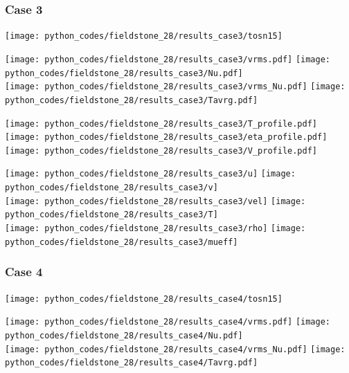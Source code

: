 \newpage %
\subsubsection*{Case 3}

\texttt{[image: python\_codes/fieldstone\_28/results\_case3/tosn15]}

\begin{center}
\texttt{[image: python\_codes/fieldstone\_28/results\_case3/vrms.pdf]}
\texttt{[image: python\_codes/fieldstone\_28/results\_case3/Nu.pdf]}\\
\texttt{[image: python\_codes/fieldstone\_28/results\_case3/vrms\_Nu.pdf]}
\texttt{[image: python\_codes/fieldstone\_28/results\_case3/Tavrg.pdf]}
\end{center}

\begin{center}
\texttt{[image: python\_codes/fieldstone\_28/results\_case3/T\_profile.pdf]}
\texttt{[image: python\_codes/fieldstone\_28/results\_case3/eta\_profile.pdf]}
\texttt{[image: python\_codes/fieldstone\_28/results\_case3/V\_profile.pdf]}
\end{center}

\newpage
\begin{center}
\texttt{[image: python\_codes/fieldstone\_28/results\_case3/u]}
\texttt{[image: python\_codes/fieldstone\_28/results\_case3/v]}\\
\texttt{[image: python\_codes/fieldstone\_28/results\_case3/vel]}
\texttt{[image: python\_codes/fieldstone\_28/results\_case3/T]}\\
\texttt{[image: python\_codes/fieldstone\_28/results\_case3/rho]}
\texttt{[image: python\_codes/fieldstone\_28/results\_case3/mueff]}
\end{center}




\newpage %
\subsubsection*{Case 4}

\texttt{[image: python\_codes/fieldstone\_28/results\_case4/tosn15]}

\begin{center}
\texttt{[image: python\_codes/fieldstone\_28/results\_case4/vrms.pdf]}
\texttt{[image: python\_codes/fieldstone\_28/results\_case4/Nu.pdf]}\\
\texttt{[image: python\_codes/fieldstone\_28/results\_case4/vrms\_Nu.pdf]}
\texttt{[image: python\_codes/fieldstone\_28/results\_case4/Tavrg.pdf]}
\end{center}

